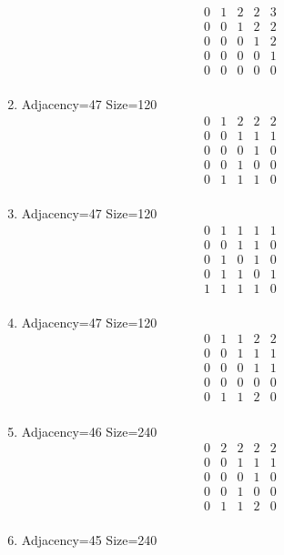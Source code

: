 \documentclass[12pt]{article}
\begin{document}
\begin{multicols}{3}
\begin{enumerate}
\begin{equation*}
\begin{array}{ccccc}
0&1&2&2&3\\
0&0&1&2&2\\
0&0&0&1&2\\
0&0&0&0&1\\
0&0&0&0&0\\
\end{array}
\end{equation*}
\item Adjacency=47 Size=120
\begin{equation*}
\begin{array}{ccccc}
0&1&2&2&2\\
0&0&1&1&1\\
0&0&0&1&0\\
0&0&1&0&0\\
0&1&1&1&0\\
\end{array}
\end{equation*}
\item Adjacency=47 Size=120
\begin{equation*}
\begin{array}{ccccc}
0&1&1&1&1\\
0&0&1&1&0\\
0&1&0&1&0\\
0&1&1&0&1\\
1&1&1&1&0\\
\end{array}
\end{equation*}
\item Adjacency=47 Size=120
\begin{equation*}
\begin{array}{ccccc}
0&1&1&2&2\\
0&0&1&1&1\\
0&0&0&1&1\\
0&0&0&0&0\\
0&1&1&2&0\\
\end{array}
\end{equation*}
\item Adjacency=46 Size=240
\begin{equation*}
\begin{array}{ccccc}
0&2&2&2&2\\
0&0&1&1&1\\
0&0&0&1&0\\
0&0&1&0&0\\
0&1&1&2&0\\
\end{array}
\end{equation*}
\item Adjacency=45 Size=240

\end{enumerate}
\end{multicols}
\end{document}
